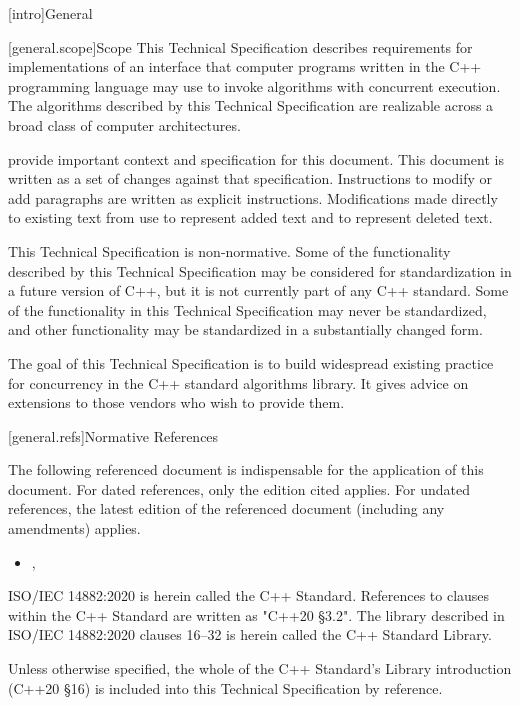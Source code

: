 
[intro]{General}

[general.scope]{Scope}
\pnum
This Technical Specification describes requirements for implementations of an interface that computer programs written in the C++ programming language may use to invoke algorithms with concurrent execution. The algorithms described by this Technical Specification are realizable across a broad class of computer architectures.

\pnum
{\cppstddocno} provide important context and specification for
this document. This document is written as a set of changes against that specification.  Instructions to modify or add paragraphs are written as
explicit instructions.  Modifications made directly to existing text from {\cppstddocno} use  to represent added text and  to represent deleted text.

\pnum
This Technical Specification is non-normative. Some of the functionality described by this Technical Specification may be considered for standardization in a future version of C++, but it is not currently part of any C++ standard. Some of the functionality in this Technical Specification may never be standardized, and other functionality may be standardized in a substantially changed form.

\pnum
The goal of this Technical Specification is to build widespread existing practice for concurrency in the C++ standard algorithms library. It gives advice on extensions to those vendors who wish to provide them.

[general.refs]{Normative References}

\pnum
The following referenced document is indispensable for the application of this document. For dated references, only the edition cited applies. For undated references, the latest edition of the referenced document (including any amendments) applies.

\begin{itemize}
\item {\cppstddocno}, 
\end{itemize}

\pnum
ISO/IEC 14882:2020 is herein called the C++ Standard. References to clauses within the C++ Standard are written as "C++20 §3.2". The library described in ISO/IEC 14882:2020 clauses 16–32 is herein called the C++ Standard Library.

\pnum
Unless otherwise specified, the whole of the C++ Standard's Library introduction (C++20 §16) is included into this Technical Specification by reference.


